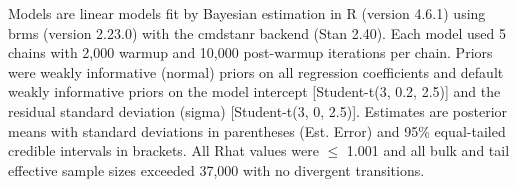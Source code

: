 \begin{landscape}
\vspace{-6pt}
\begin{minipage}{\linewidth}
\setlength{\parskip}{0pt}\scriptsize
Models are linear models fit by Bayesian estimation in R (version 4.6.1) using brms (version 2.23.0) with the cmdstanr backend (Stan 2.40). Each model used 5 chains with 2,000 warmup and 10,000 post-warmup iterations per chain. Priors were weakly informative (normal) priors on all regression coefficients and default weakly informative priors on the model intercept [Student-t(3, 0.2, 2.5)] and the residual standard deviation (sigma) [Student-t(3, 0, 2.5)]. Estimates are posterior means with standard deviations in parentheses (Est. Error) and 95\% equal-tailed credible intervals in brackets. All Rhat values were $\leq$ 1.001 and all bulk and tail effective sample sizes exceeded 37,000 with no divergent transitions.
\end{minipage}
\end{landscape}
